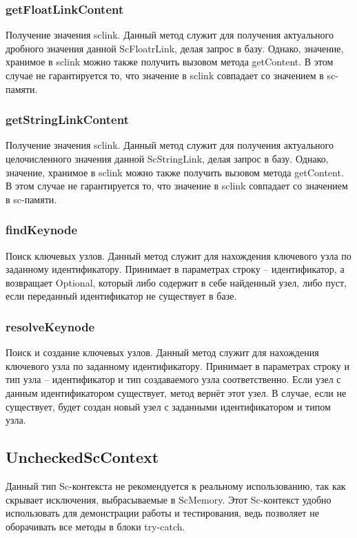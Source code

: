 \subsubsection {getFloatLinkContent} 

Получение значения sclink. Данный метод служит для получения актуального дробного значения данной ScFloatrLink, делая запрос в базу. Однако, значение, хранимое в sclink можно также получить вызовом метода getContent. В этом случае не гарантируется то, что значение в sclink совпадает со значением в sc-памяти.

\subsubsection {getStringLinkContent} 

Получение значения sclink. Данный метод служит для получения актуального целочисленного значения данной ScStringLink, делая запрос в базу. Однако, значение, хранимое в sclink можно также получить вызовом метода getContent. В этом случае не гарантируется то, что значение в sclink совпадает со значением в sc-памяти.

\subsubsection{findKeynode}

Поиск ключевых узлов. Данный метод служит для нахождения ключевого узла по заданному идентификатору. Принимает в параметрах строку -- идентификатор, а возвращает Optional, который либо содержит в себе найденный узел, либо пуст, если переданный идентификатор не существует в базе. 

\subsubsection{resolveKeynode}

Поиск и создание ключевых узлов. Данный метод служит для нахождения ключевого узла по заданному идентификатору. Принимает в параметрах строку и тип узла -- идентификатор и тип создаваемого узла соответственно. Если узел с данным идентификатором существует, метод вернёт этот узел. В случае, если не существует, будет создан новый узел с заданными идентификатором и типом узла. 

\subsection{UncheckedScContext}
Данный тип Sc-контекста не рекомендуется к реальному использованию, так как скрывает исключения, выбрасываемые в ScMemory. Этот Sc-контекст удобно использовать для демонстрации работы и тестирования, ведь позволяет не оборачивать все методы в блоки try-catch. 

